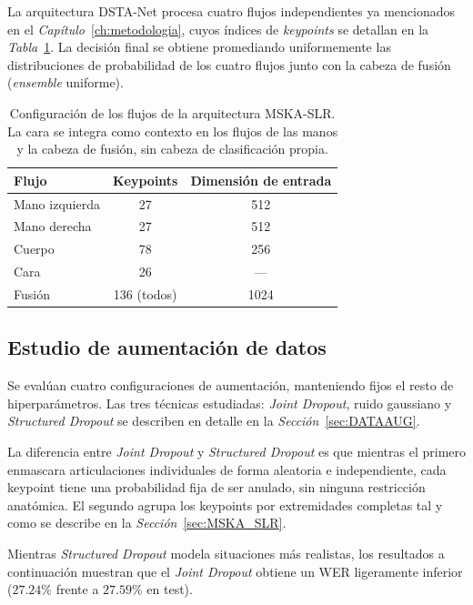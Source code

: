 La arquitectura DSTA-Net procesa cuatro flujos independientes ya mencionados en el \textit{Capítulo}~\ref{ch:metodologia}, cuyos índices de \textit{keypoints} se detallan en la \textit{Tabla}~\ref{tab:streams}.
La decisión final se obtiene promediando uniformemente las distribuciones de probabilidad de los cuatro flujos junto con la cabeza de fusión (\textit{ensemble} uniforme).
\begin{table}[H]
	\centering
	\begin{tabular}{lcc}
		\hline
		\textbf{Flujo}      & \textbf{Keypoints} & \textbf{Dimensión de entrada} \\ \hline
		Mano izquierda      & 27                 & 512                           \\
		Mano derecha        & 27                 & 512                           \\
		Cuerpo              & 78                 & 256                           \\
		Cara                & 26                 & ---                           \\
		Fusión              & 136 (todos)        & 1024                          \\ \hline
	\end{tabular}
	\caption{Configuración de los flujos de la arquitectura MSKA-SLR\@. La cara se integra como contexto en los flujos de las manos y la cabeza de fusión, sin cabeza de clasificación propia.}
	\label{tab:streams}
\end{table}

\subsection{Estudio de aumentación de datos}
Se evalúan cuatro configuraciones de aumentación, manteniendo fijos el resto de hiperparámetros.
Las tres técnicas estudiadas: \textit{Joint Dropout}, ruido gaussiano y \textit{Structured Dropout} se describen en detalle en la \textit{Sección}~\ref{sec:DATAAUG}.

La diferencia entre \textit{Joint Dropout} y \textit{Structured Dropout} es que mientras el primero enmascara articulaciones individuales de forma aleatoria e independiente, cada keypoint tiene una probabilidad
fija de ser anulado, sin ninguna restricción anatómica.
El segundo agrupa los keypoints por extremidades completas tal y como se describe en la \textit{Sección}~\ref{sec:MSKA_SLR}.

Mientras \textit{Structured Dropout} modela situaciones más realistas, los resultados a continuación muestran que el \textit{Joint Dropout} obtiene un WER ligeramente inferior ($27.24\%$ frente a $27.59\%$ en test).

